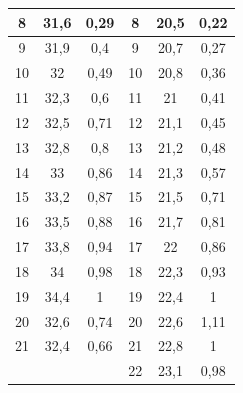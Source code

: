 \documentclass[a4paper,12pt]{article}
\begin{document}
\begin{enumerate}
\begin{table}[h]
\begin{tabular}{ccc||c|c|c|}
\multicolumn{1}{|c|}{8} & \multicolumn{1}{c|}{31,6} & 0,29 & 8 & 20,5 & 0,22 \\ \hline
\multicolumn{1}{|c|}{9} & \multicolumn{1}{c|}{31,9} & 0,4 & 9 & 20,7 & 0,27 \\ \hline
\multicolumn{1}{|c|}{10} & \multicolumn{1}{c|}{32} & 0,49 & 10 & 20,8 & 0,36 \\ \hline
\multicolumn{1}{|c|}{11} & \multicolumn{1}{c|}{32,3} & 0,6 & 11 & 21 & 0,41 \\ \hline
\multicolumn{1}{|c|}{12} & \multicolumn{1}{c|}{32,5} & 0,71 & 12 & 21,1 & 0,45 \\ \hline
\multicolumn{1}{|c|}{13} & \multicolumn{1}{c|}{32,8} & 0,8 & 13 & 21,2 & 0,48 \\ \hline
\multicolumn{1}{|c|}{14} & \multicolumn{1}{c|}{33} & 0,86 & 14 & 21,3 & 0,57 \\ \hline
\multicolumn{1}{|c|}{15} & \multicolumn{1}{c|}{33,2} & 0,87 & 15 & 21,5 & 0,71 \\ \hline
\multicolumn{1}{|c|}{16} & \multicolumn{1}{c|}{33,5} & 0,88 & 16 & 21,7 & 0,81 \\ \hline
\multicolumn{1}{|c|}{17} & \multicolumn{1}{c|}{33,8} & 0,94 & 17 & 22 & 0,86 \\ \hline
\multicolumn{1}{|c|}{18} & \multicolumn{1}{c|}{34} & 0,98 & 18 & 22,3 & 0,93 \\ \hline
\multicolumn{1}{|c|}{19} & \multicolumn{1}{c|}{34,4} & 1 & 19 & 22,4 & 1 \\ \hline
\multicolumn{1}{|c|}{20} & \multicolumn{1}{c|}{32,6} & 0,74 & 20 & 22,6 & 1,11 \\ \hline
\multicolumn{1}{|c|}{21} & \multicolumn{1}{c|}{32,4} & 0,66 & 21 & 22,8 & 1 \\ \hline
 &  &  & 22 & 23,1 & 0,98 \\ \cline{4-6} 
\end{tabular}
\end{table}
\end{enumerate}
\newpage
\end{document}
